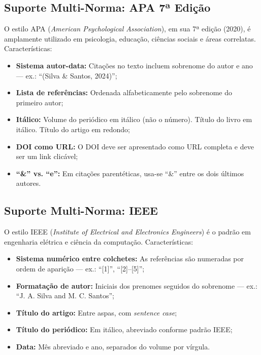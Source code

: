 \subsection{Suporte Multi-Norma: APA 7ª Edição}
\label{sec:apa}

O estilo APA (\textit{American Psychological Association}), em sua
7ª edição (2020), é amplamente utilizado em psicologia, educação,
ciências sociais e áreas correlatas. Características:

\begin{itemize}
    \item \textbf{Sistema autor-data:} Citações no texto incluem
    sobrenome do autor e ano — ex.: ``(Silva \& Santos, 2024)'';

    \item \textbf{Lista de referências:} Ordenada alfabeticamente
    pelo sobrenome do primeiro autor;

    \item \textbf{Itálico:} Volume do periódico em itálico (não o
    número). Título do livro em itálico. Título do artigo em
    redondo;

    \item \textbf{DOI como URL:} O DOI deve ser apresentado como
    URL completa e deve ser um link clicável;

    \item \textbf{``\&'' vs. ``e'':} Em citações parentéticas,
    usa-se ``\&'' entre os dois últimos autores.
\end{itemize}

\subsection{Suporte Multi-Norma: IEEE}
\label{sec:ieee}

O estilo IEEE (\textit{Institute of Electrical and Electronics
Engineers}) é o padrão em engenharia elétrica e ciência da
computação. Características:

\begin{itemize}
    \item \textbf{Sistema numérico entre colchetes:} As referências
    são numeradas por ordem de aparição — ex.: ``[1]'', ``[2]--[5]'';

    \item \textbf{Formatação de autor:} Iniciais dos prenomes
    seguidos do sobrenome — ex.: ``J. A. Silva and M. C. Santos'';

    \item \textbf{Título do artigo:} Entre aspas, com
    \textit{sentence case};

    \item \textbf{Título do periódico:} Em itálico, abreviado
    conforme padrão IEEE;

    \item \textbf{Data:} Mês abreviado e ano, separados do volume
    por vírgula.
\end{itemize}

